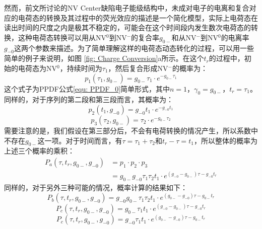 \documentclass[type = bachelor]{whu-thesis}
\begin{document}
然而，前文所讨论的NV Center缺陷电子能级结构中，未成对电子的电离和复合对应的电荷态的转换及其过程中的荧光效应的描述是一个简化模型，实际上电荷态在读出时间的尺度之内是极其不稳定的，可能会在这个时间段内发生数次电荷态的转换，这种电荷态转换可以用从NV$^0$到NV$^-$的复合率$g_{0-}$和从NV$^-$到NV$^0$的电离率$g_{-0}$这两个参数来描述。为了简单理解这样的电荷态动态转化的过程，可以用一些简单的例子来说明，如图 \ref{fig: Charge Conversion}a所示。在这个$t_r$的过程中，初始的电荷态为NV$^0$，持续时间为$\tau_1$，然后复合形成NV$^-$的概率为：
\begin{equation}
  p_1(\tau_1,g_{0-}) = g_{0-}\tau_1 \cdot e^{-g_{0-}\tau_1}
\end{equation}
这个式子为PPDF公式\ref{equ: PPDF_0}简单形式，其中$n=1$，$\gamma_0 = g_{0-}$，$t_r=\tau_1$。
同样的，对于序列的第二段和第三段而言，其概率为：
\begin{equation}
  p_2(t_1,g_{-0}) = g_{-0}t_1 \cdot e^{-g_{-0}t_1}
\end{equation}
\begin{equation}
  p_3(\tau_2,g_{0-}) = \tau_2 \cdot e^{-g_{0-}\tau_2}
\end{equation}
需要注意的是，我们假设在第三部分后，不会有电荷转换的情况产生，所以系数中不存在$g_{0-}$这一项。对于时间而言，有$\tau=\tau_1+\tau_2$和$t_r-\tau=t_1$，所以整体的概率为上述三个概率的乘积：
\begin{equation}
  \begin{aligned}
    P_a(\tau,t_r,g_{0-},g_{-0}) &= p_1 \cdot p_2 \cdot p_3 \\
    &= g_{0-}g_{-0}\tau_1\tau_2t_1 \cdot e^{(g_{-0}-g_{0-})\tau-g_{-0}t_r}
  \end{aligned}
\end{equation}
同样的，对于另外三种可能的情况，概率计算的结果如下：
\begin{equation}
  P_b(\tau,t_r,g_{0-},g_{-0}) = g_{-0}g_{0-}\tau_1\tau_2t_1 \cdot e^{(g_{0-}-g_{-0})\tau-g_{0-}t_r}
\end{equation}
\begin{equation}
  P_c(\tau,t_r,g_{0-},g_{-0}) = g_{0-}\tau_1t_1 \cdot e^{(g_{-0}-g_{0-})\tau-g_{-0}t_r}
\end{equation}
\begin{equation}
  P_c(\tau,t_r,g_{0-},g_{-0}) = g_{-0}\tau_1t_1 \cdot e^{(g_{0-}-g_{-0})\tau-g_{0-}t_r}
\end{equation}
\end{document}
